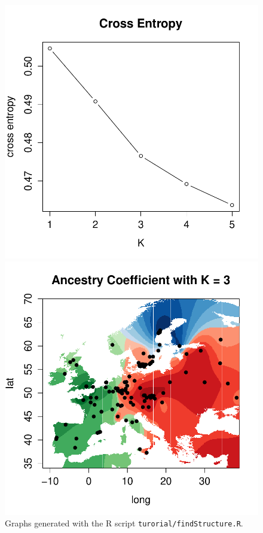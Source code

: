 \documentclass[10pt,a4paper]{article}
\begin{document}
\begin{figure}[h!]\centering
\begin{minipage}{0.49\textwidth}
\includegraphics[width=\linewidth]{crossEntropy.pdf}
\end{minipage}
\begin {minipage}{0.49\textwidth}
\includegraphics[width=\linewidth]{map.pdf}
\end{minipage}
\caption{Graphs generated with the R script {\tt turorial/findStructure.R}.}\label{fig:map}
\end{figure} 
\end{document}
